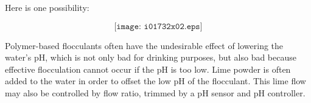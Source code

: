 





Here is one possibility:

$$\texttt{[image: i01732x02.eps]}$$

Polymer-based flocculants often have the undesirable effect of lowering the water's pH, which is not only bad for drinking purposes, but also bad because effective flocculation cannot occur if the pH is too low.  Lime powder is often added to the water in order to offset the low pH of the flocculant.  This lime flow may also be controlled by flow ratio, trimmed by a pH sensor and pH controller.




